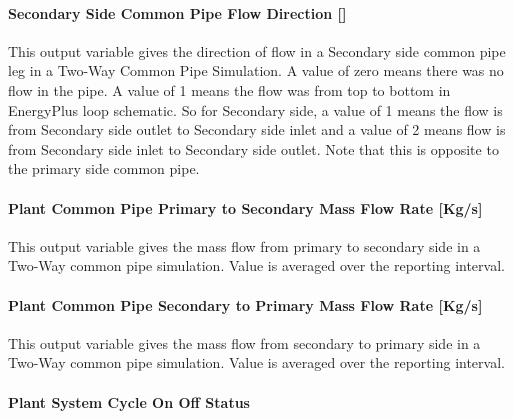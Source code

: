 \paragraph{\texorpdfstring{Secondary Side Common Pipe Flow Direction {[]}}{Secondary Side Common Pipe Flow Direction }}\label{secondary-side-common-pipe-flow-direction}

This output variable gives the direction of flow in a Secondary side common pipe leg in a Two-Way Common Pipe Simulation. A value of zero means there was no flow in the pipe. A value of 1 means the flow was from top to bottom in EnergyPlus loop schematic. So for Secondary side, a value of 1 means the flow is from Secondary side outlet to Secondary side inlet and a value of 2 means flow is from Secondary side inlet to Secondary side outlet. Note that this is opposite to the primary side common pipe.

\paragraph{Plant Common Pipe Primary to Secondary Mass Flow Rate {[}Kg/s{]}}\label{plant-common-pipe-primary-to-secondary-mass-flow-rate-kgs}

This output variable gives the mass flow from primary to secondary side in a Two-Way common pipe simulation. Value is averaged over the reporting interval.

\paragraph{Plant Common Pipe Secondary to Primary Mass Flow Rate {[}Kg/s{]}}\label{plant-common-pipe-secondary-to-primary-mass-flow-rate-kgs}

This output variable gives the mass flow from secondary to primary side in a Two-Way common pipe simulation. Value is averaged over the reporting interval.

\paragraph{Plant System Cycle On Off Status}\label{plant-system-cycle-on-off-status}

